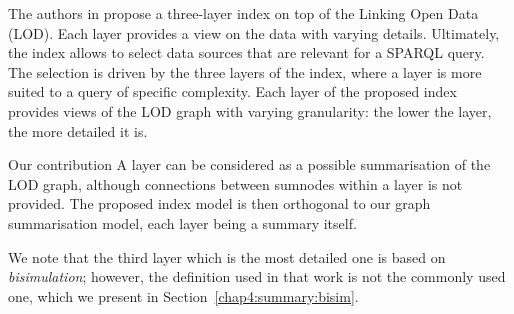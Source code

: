 The authors in \cite{konrath:jws:2012} propose a three-layer index on top of the Linking Open Data (LOD). Each layer provides a view on the data with varying details. Ultimately, the index allows to select data sources that are relevant for a SPARQL query. The selection is driven by the three layers of the index, where a layer is more suited to a query of specific complexity.
Each layer of the proposed index provides views of the LOD graph with varying granularity: the lower the layer, the more detailed it is.

\begin{centeremph}{Our contribution}
	A layer can be considered as a possible summarisation of the LOD graph, although connections between sumnodes within a layer is not provided. The proposed index model is then orthogonal to our graph summarisation model, each layer being a summary itself.

	We note that the third layer which is the most detailed one is based on \emph{bisimulation}; however, the definition used in that work is not the commonly used one, which we present in Section~\ref{chap4:summary:bisim}.
\end{centeremph}





